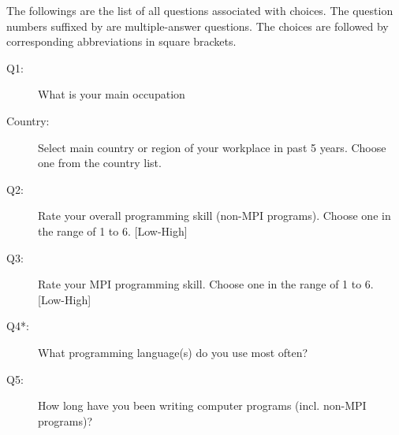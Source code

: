 \documentclass[preprint,5p,times]{elsarticle}
\def\myquote#1{{\it #1}}
\begin{document}
The followings are the list of all questions associated with
choices. The question numbers suffixed by \myquote{*} are
multiple-answer questions. The choices are followed by corresponding
abbreviations in square brackets.
\vspace{3mm}
{\footnotesize
  \begin{description}
  \item[Q1:] What is your main occupation
  \item[Country:] \hspace{3mm}Select main country or region of your workplace in past 5 years.
    Choose one from the country list.
  \item[Q2:] Rate your overall programming skill (non-MPI programs).
    Choose one in the range of 1 to 6. [Low-High]
  \item[Q3:] Rate your MPI programming skill.
    Choose one in the range of 1 to 6. [Low-High]
  \item[Q4*:] What programming language(s) do you use most often?
  \item[Q5:] How long have you been writing computer programs (incl. non-MPI programs)?
\end{description}}
\end{document}

